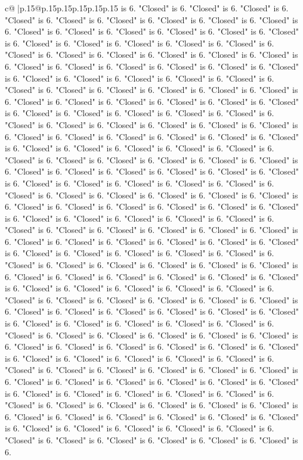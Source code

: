\documentclass{article}
\begin{document}
{\begin{supertabular}{c@{$\;$}|p{.15\linewidth}@{}p{.15\linewidth}p{.15\linewidth}p{.15\linewidth}p{.15\linewidth}p{.15\linewidth}}
{{{is 6. "Closed" is 6. "Closed" is 6. "Closed" is 6. "Closed" is 6. "Closed" is 6. "Closed" is 6. "Closed" is 6. "Closed" is 6. "Closed" is 6. "Closed" is 6. "Closed" is 6. "Closed" is 6. "Closed" is 6. "Closed" is 6. "Closed" is 6. "Closed" is 6. "Closed" is 6. "Closed" is 6. "Closed" is 6. "Closed" is 6. "Closed" is 6. "Closed" is 6. "Closed" is 6. "Closed" is 6. "Closed" is 6. "Closed" is 6. "Closed" is 6. "Closed" is 6. "Closed" is 6. "Closed" is 6. "Closed" is 6. "Closed" is 6. "Closed" is 6. "Closed" is 6. "Closed" is 6. "Closed" is 6. "Closed" is 6. "Closed" is 6. "Closed" is 6. "Closed" is 6. "Closed" is 6. "Closed" is 6. "Closed" is 6. "Closed" is 6. "Closed" is 6. "Closed" is 6. "Closed" is 6. "Closed" is 6. "Closed" is 6. "Closed" is 6. "Closed" is 6. "Closed" is 6. "Closed" is 6. "Closed" is 6. "Closed" is 6. "Closed" is 6. "Closed" is 6. "Closed" is 6. "Closed" is 6. "Closed" is 6. "Closed" is 6. "Closed" is 6. "Closed" is 6. "Closed" is 6. "Closed" is 6. "Closed" is 6. "Closed" is 6. "Closed" is 6. "Closed" is 6. "Closed" is 6. "Closed" is 6. "Closed" is 6. "Closed" is 6. "Closed" is 6. "Closed" is 6. "Closed" is 6. "Closed" is 6. "Closed" is 6. "Closed" is 6. "Closed" is 6. "Closed" is 6. "Closed" is 6. "Closed" is 6. "Closed" is 6. "Closed" is 6. "Closed" is 6. "Closed" is 6. "Closed" is 6. "Closed" is 6. "Closed" is 6. "Closed" is 6. "Closed" is 6. "Closed" is 6. "Closed" is 6. "Closed" is 6. "Closed" is 6. "Closed" is 6. "Closed" is 6. "Closed" is 6. "Closed" is 6. "Closed" is 6. "Closed" is 6. "Closed" is 6. "Closed" is 6. "Closed" is 6. "Closed" is 6. "Closed" is 6. "Closed" is 6. "Closed" is 6. "Closed" is 6. "Closed" is 6. "Closed" is 6. "Closed" is 6. "Closed" is 6. "Closed" is 6. "Closed" is 6. "Closed" is 6. "Closed" is 6. "Closed" is 6. "Closed" is 6. "Closed" is 6. "Closed" is 6. "Closed" is 6. "Closed" is 6. "Closed" is 6. "Closed" is 6. "Closed" is 6. "Closed" is 6. "Closed" is 6. "Closed" is 6. "Closed" is 6. "Closed" is 6. "Closed" is 6. "Closed" is 6. "Closed" is 6. "Closed" is 6. "Closed" is 6. "Closed" is 6. "Closed" is 6. "Closed" is 6. "Closed" is 6. "Closed" is 6. "Closed" is 6. "Closed" is 6. "Closed" is 6. "Closed" is 6. "Closed" is 6. "Closed" is 6. "Closed" is 6. "Closed" is 6. "Closed" is 6. "Closed" is 6. "Closed" is 6. "Closed" is 6. "Closed" is 6. "Closed" is 6. "Closed" is 6. "Closed" is 6. "Closed" is 6. "Closed" is 6. "Closed" is 6. "Closed" is 6. "Closed" is 6. "Closed" is 6. "Closed" is 6. "Closed" is 6. "Closed" is 6. "Closed" is 6. "Closed" is 6. "Closed" is 6. "Closed" is 6. "Closed" is 6. "Closed" is 6. "Closed" is 6. "Closed" is 6. "Closed" is 6. "Closed" is 6. "Closed" is 6. "Closed" is 6. "Closed" is 6. "Closed" is 6. "Closed" is 6. "Closed" is 6. "Closed" is 6. "Closed" is 6. "Closed" is 6. "Closed" is 6. "Closed" is 6. "Closed" is 6. "Closed" is 6. "Closed" is 6. "Closed" is 6. "Closed" is 6. "Closed" is 6. "Closed" is 6. "Closed" is 6. "Closed" is 6. "Closed" is 6. "Closed" is 6. "Closed" is 6. "Closed" is 6. "Closed" is 6. "Closed" is 6. "Closed" is 6. "Closed" is 6. "Closed" is 6. "Closed" is 6. "Closed" is 6. "Closed" is 6. "Closed" is 6. "Closed" is 6. "Closed" is 6. "Closed" is 6. }}}
\end{supertabular}}
\end{document}
